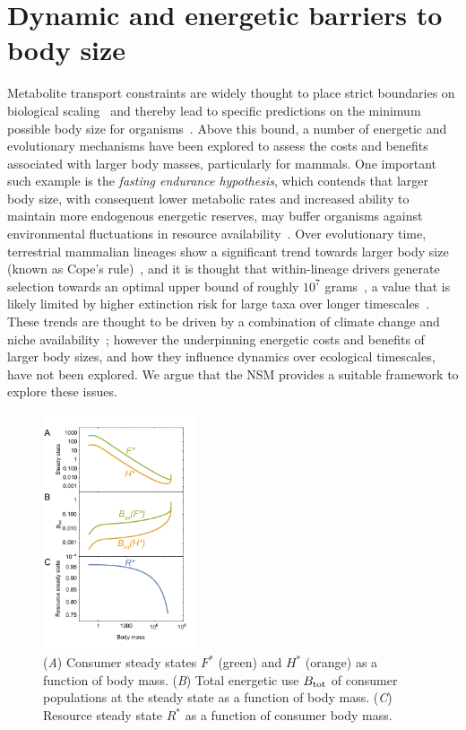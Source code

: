 \documentclass[twocolumn,preprintnumbers,amsmath,amssymb,superscriptaddress]{revtex4}
\begin{document}
\section*{Dynamic and energetic barriers to body size}
Metabolite transport constraints are widely thought to place strict
boundaries on biological
scaling~\cite{Brown:1993p708,West:1997cg,Brown:2004wq} and thereby lead to
specific predictions on the minimum possible body size for
organisms~\cite{West:2002ud}.  Above this bound, a number of energetic and
evolutionary mechanisms have been explored to assess the costs and benefits
associated with larger body masses, particularly for mammals.  One important
such example is the \emph{fasting endurance hypothesis}, which contends that
larger body size, with consequent lower metabolic rates and increased ability
to maintain more endogenous energetic reserves, may buffer organisms against
environmental fluctuations in resource availability~\cite{Millar:1990p923}.
Over evolutionary time, terrestrial mammalian lineages show a significant
trend towards larger body size (known as Cope's
rule)~\cite{Alroy:1998p1594,Clauset:2009fh,Smith:2010p3442,Saarinen:2014br},
and it is thought that within-lineage drivers generate selection towards an
optimal upper bound of roughly $10^7$ grams~\cite{Alroy:1998p1594}, a value
that is likely limited by higher extinction risk for large taxa over longer
timescales~\cite{Clauset:2009fh}.  These trends are thought to be driven by a
combination of climate change and niche availability~\cite{Saarinen:2014br};
however the underpinning energetic costs and benefits of larger body sizes,
and how they influence dynamics over ecological timescales, have not been
explored.  We argue that the NSM provides a suitable framework to explore
these issues.


 
\begin{figure}
\includegraphics[width=0.4\textwidth]{fig_FPAllometric.pdf}
\caption{\small (\emph{A}) Consumer steady states $F^*$ (green) and $H^*$
  (orange) as a function of body mass.  (\emph{B}) Total energetic use
  $B_{\rm tot}$ of consumer populations at the steady state as a function of
  body mass.  (\emph{C}) Resource steady state $R^*$ as a function of
  consumer body mass.}
\label{fig:mass}
\end{figure}  
\end{document}
